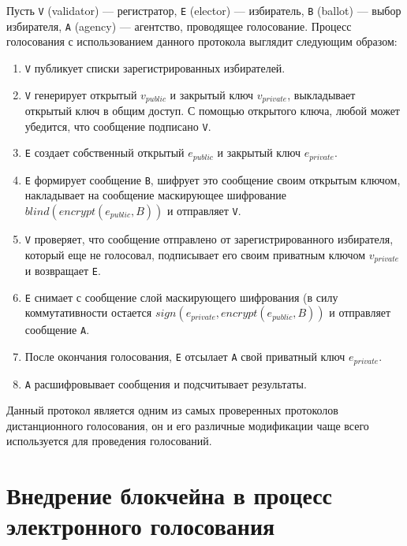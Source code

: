 Пусть \verb|V| (validator) — регистратор, \verb|E| (elector) — избиратель, \verb|B| (ballot) — выбор избирателя, \verb|A| (agency) — агентство, проводящее голосование. Процесс голосования с использованием данного протокола выглядит следующим образом:

\begin{enumerate} 
  \item \verb|V| публикует списки зарегистрированных избирателей.
  
  \item \verb|V| генерирует открытый \(v_{public}\) и закрытый ключ \(v_{private}\), выкладывает открытый ключ в общим доступ. С помощью открытого ключа, любой может убедится, что сообщение подписано \verb|V|.
  
  \item \verb|E| создает собственный открытый \(e_{public}\) и закрытый ключ \(e_{private}\).
  
  \item \verb|E| формирует сообщение \verb|B|, шифрует это сообщение своим открытым ключом, накладывает на сообщение маскирующее шифрование \(blind(encrypt(e_{public}, B))\) и отправляет \verb|V|.
  
  \item \verb|V| проверяет, что сообщение отправлено от зарегистрированного избирателя, который еще не голосовал, подписывает его своим приватным ключом \(v_{private}\) и возвращает \verb|E|.
  
  \item \verb|E| снимает с сообщение слой маскирующего шифрования (в силу коммутативности остается \(sign(e_{private}, encrypt(e_{public}, B))\) и отправляет сообщение \verb|A|.
  
  \item После окончания голосования, \verb|E| отсылает \verb|A| свой приватный ключ \(e_{private}\).
  
  \item \verb|A| расшифровывает сообщения и подсчитывает результаты.  
\end{enumerate}

Данный протокол является одним из самых проверенных протоколов дистанционного голосования, он и его различные модификации чаще всего используется для проведения голосований.

\section{Внедрение блокчейна в процесс электронного голосования}

